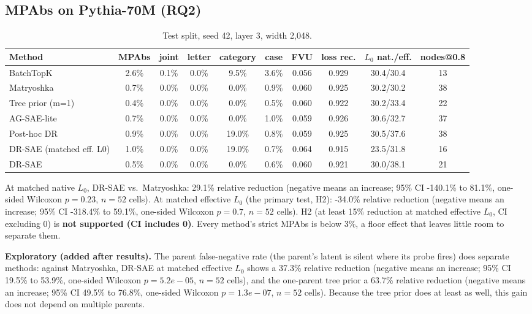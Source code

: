 \documentclass[10pt]{article}
\begin{document}
\subsection{MPAbs on Pythia-70M (RQ2)}
\begin{table}[h]\centering\scriptsize
\begin{tabular}{lccccccccc}\toprule
Method & MPAbs & joint & letter & category & case & FVU & loss rec. & $L_0$ nat./eff. & nodes@0.8 \\\midrule
BatchTopK & 2.6\% & 0.1\% & 0.0\% & 9.5\% & 3.6\% & 0.056 & 0.929 & 30.4/30.4 & 13 \\
Matryoshka & 0.7\% & 0.0\% & 0.0\% & 0.0\% & 0.9\% & 0.060 & 0.925 & 30.2/30.2 & 38 \\
Tree prior (m=1) & 0.4\% & 0.0\% & 0.0\% & 0.0\% & 0.5\% & 0.060 & 0.922 & 30.2/33.4 & 22 \\
AG-SAE-lite & 0.7\% & 0.0\% & 0.0\% & 0.0\% & 1.0\% & 0.059 & 0.926 & 30.6/32.7 & 37 \\
Post-hoc DR & 0.9\% & 0.0\% & 0.0\% & 19.0\% & 0.8\% & 0.059 & 0.925 & 30.5/37.6 & 38 \\
DR-SAE (matched eff. L0) & 1.0\% & 0.0\% & 0.0\% & 19.0\% & 0.7\% & 0.064 & 0.915 & 23.5/31.8 & 16 \\
DR-SAE & 0.5\% & 0.0\% & 0.0\% & 0.0\% & 0.6\% & 0.060 & 0.921 & 30.0/38.1 & 21 \\
\bottomrule\end{tabular}
\caption{Test split, seed 42, layer 3, width 2{,}048.}
\end{table}
At matched native $L_0$, DR-SAE vs.\ Matryoshka: 29.1\% relative reduction (negative means an increase; 95\% CI -140.1\% to 81.1\%, one-sided Wilcoxon $p = 0.23$, $n = 52$ cells). At matched effective $L_0$ (the primary test, H2): -34.0\% relative reduction (negative means an increase; 95\% CI -318.4\% to 59.1\%, one-sided Wilcoxon $p = 0.7$, $n = 52$ cells). H2 (at least 15\% reduction at matched effective $L_0$, CI excluding 0) is \textbf{not supported (CI includes 0)}. Every method's strict MPAbs is below 3\%, a floor effect that leaves little room to separate them.

\textbf{Exploratory (added after results).} The parent false-negative rate (the parent's latent is silent where its probe fires) does separate methods: against Matryoshka, DR-SAE at matched effective $L_0$ shows a 37.3\% relative reduction (negative means an increase; 95\% CI 19.5\% to 53.9\%, one-sided Wilcoxon $p = 5.2e-05$, $n = 52$ cells), and the one-parent tree prior a 63.7\% relative reduction (negative means an increase; 95\% CI 49.5\% to 76.8\%, one-sided Wilcoxon $p = 1.3e-07$, $n = 52$ cells). Because the tree prior does at least as well, this gain does not depend on multiple parents.
\end{document}
